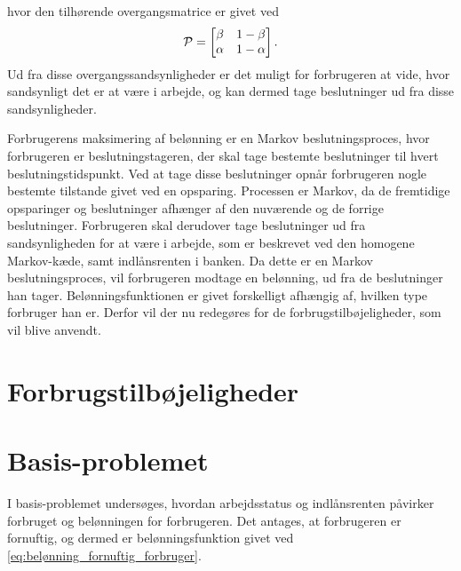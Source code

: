 hvor den tilhørende overgangsmatrice er givet ved
\begin{align*}
    \P=\begin{bmatrix}\beta & 1-\beta\\ \alpha & 1-\alpha\end{bmatrix}.
\end{align*}
Ud fra disse overgangssandsynligheder er det muligt for forbrugeren at vide, hvor sandsynligt det er at være i arbejde, og kan dermed tage beslutninger ud fra disse sandsynligheder.

Forbrugerens maksimering af belønning er en Markov beslutningsproces, hvor forbrugeren er beslutningstageren, der skal tage bestemte beslutninger til hvert beslutningstidspunkt. Ved at tage disse beslutninger opnår forbrugeren nogle bestemte tilstande givet ved en opsparing. Processen er Markov, da de fremtidige opsparinger og beslutninger afhænger af den nuværende og de forrige beslutninger. Forbrugeren skal derudover tage beslutninger ud fra sandsynligheden for at være i arbejde, som er beskrevet ved den homogene Markov-kæde, samt indlånsrenten i banken. %
Da dette er en Markov beslutningsproces, vil forbrugeren modtage en belønning, ud fra de beslutninger han tager. Belønningsfunktionen er givet forskelligt afhængig af, hvilken type forbruger han er. Derfor vil der nu redegøres for de forbrugstilbøjeligheder, som vil blive anvendt. 


\section{Forbrugstilbøjeligheder}


\section{Basis-problemet}
I basis-problemet undersøges, hvordan arbejdsstatus og indlånsrenten påvirker forbruget og belønningen for forbrugeren. Det antages, at forbrugeren er fornuftig, og dermed er belønningsfunktion givet ved \eqref{eq:belønning_fornuftig_forbruger}. 

